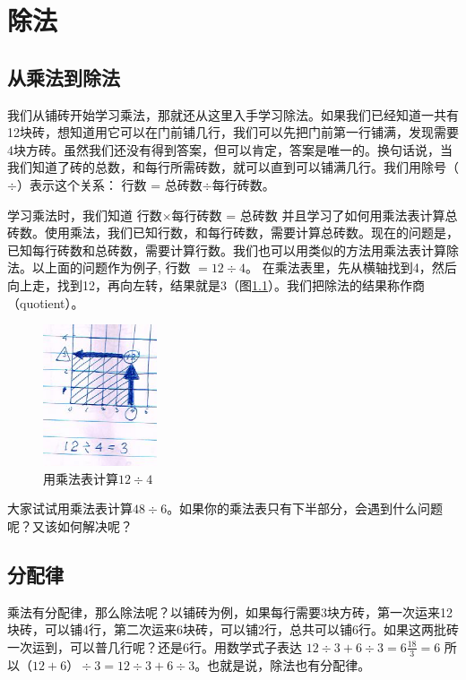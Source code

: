 \chapter{除法}
\section{从乘法到除法}

我们从铺砖开始学习乘法，那就还从这里入手学习除法。如果我们已经知道一共有12块砖，想知道用它可以在门前铺几行，我们可以先把门前第一行铺满，发现需要4块方砖。虽然我们还没有得到答案，但可以肯定，答案是唯一的。换句话说，当我们知道了砖的总数，和每行所需砖数，就可以直到可以铺满几行。我们用除号（$\div$）表示这个关系： 行数 = 总砖数$\div$每行砖数。

学习乘法时，我们知道
行数$\times$每行砖数 = 总砖数 并且学习了如何用乘法表计算总砖数。使用乘法，我们已知行数，和每行砖数，需要计算总砖数。现在的问题是，已知每行砖数和总砖数，需要计算行数。我们也可以用类似的方法用乘法表计算除法。以上面的问题作为例子, 行数 $= 12\div4$。 在乘法表里，先从横轴找到4，然后向上走，找到12，再向左转，结果就是3（图\ref{img_division}）。我们把除法的结果称作商（quotient）。
    
    \begin{figure}[h]
         \center
         \includegraphics[width=0.3\textwidth]{division_res/division}
         \caption{用乘法表计算$12\div4$}
         \label{img_division}
    \end{figure}
    
大家试试用乘法表计算$48\div6$。如果你的乘法表只有下半部分，会遇到什么问题呢？又该如何解决呢？

\section{分配律}

乘法有分配律，那么除法呢？以铺砖为例，如果每行需要3块方砖，第一次运来12块砖，可以铺4行，第二次运来6块砖，可以铺2行，总共可以铺6行。如果这两批砖一次运到，可以普几行呢？还是6行。用数学式子表达 $12\div3 + 6\div3 = 6\frac{18}{3} = 6$ 所以$（12+6）\div 3 = 12\div3 + 6\div3$。也就是说，除法也有分配律。

